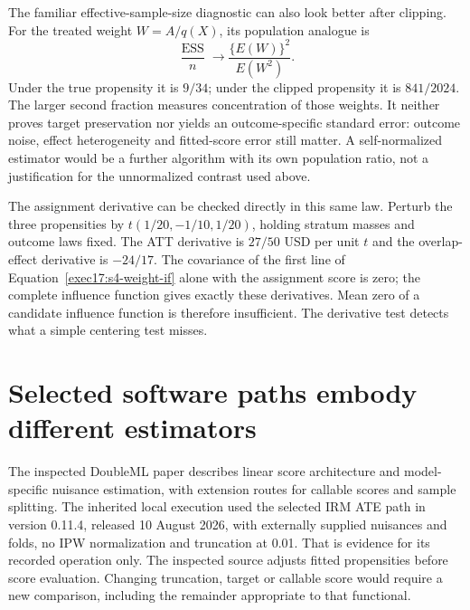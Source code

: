 The familiar effective-sample-size diagnostic can also look better after
clipping. For the treated weight $W=A/q(X)$, its population analogue is
\[
 \frac{\operatorname{ESS}}{n}\longrightarrow
       \frac{\{E(W)\}^2}{E(W^2)}.
\]
Under the true propensity it is $9/34$; under the clipped propensity it is
$841/2024$. The larger second fraction measures concentration of those
weights. It neither proves target preservation nor yields an outcome-specific
standard error: outcome noise, effect heterogeneity and fitted-score error
still matter. A self-normalized estimator would be a further algorithm with
its own population ratio, not a justification for the unnormalized contrast
used above.

The assignment derivative can be checked directly in this same law. Perturb
the three propensities by $t(1/20,-1/10,1/20)$, holding stratum masses and
outcome laws fixed. The ATT derivative is $27/50$ USD per unit $t$ and the
overlap-effect derivative is $-24/17$. The covariance of the first line of
Equation~\eqref{exec17:s4-weight-if} alone with the assignment score is zero;
the complete influence function gives exactly these derivatives. Mean zero
of a candidate influence function is therefore insufficient. The derivative
test detects what a simple centering test misses.~\citep{exec17_s4_math}

\section{Selected software paths embody different estimators}
\label{exec17:s4-paths}

The inspected DoubleML paper describes linear score architecture and
model-specific nuisance estimation, with extension routes for callable scores
and sample splitting. The inherited local execution used the selected IRM
ATE path in version 0.11.4, released 10 August 2026, with externally supplied
nuisances and folds, no IPW normalization and truncation at 0.01. That is
evidence for its recorded operation only. The inspected source adjusts fitted
propensities before score evaluation. Changing truncation, target or callable
score would require a new comparison, including the remainder appropriate to
that functional.~\citep{doubleml2022,runtime_doubleml_scope,exec17_s4_paths}

